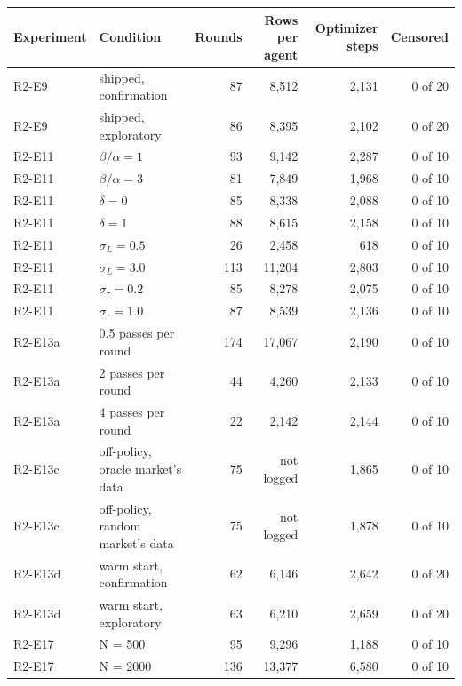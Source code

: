 \footnotesize
\begin{tabular}{llrrrr}
\hline
Experiment & Condition & Rounds & Rows per agent & Optimizer steps & Censored \\
\hline
R2-E9 & shipped, confirmation & 87 & 8{,}512 & 2{,}131 & 0 of 20 \\
R2-E9 & shipped, exploratory & 86 & 8{,}395 & 2{,}102 & 0 of 20 \\
R2-E11 & $\beta/\alpha = 1$ & 93 & 9{,}142 & 2{,}287 & 0 of 10 \\
R2-E11 & $\beta/\alpha = 3$ & 81 & 7{,}849 & 1{,}968 & 0 of 10 \\
R2-E11 & $\delta = 0$ & 85 & 8{,}338 & 2{,}088 & 0 of 10 \\
R2-E11 & $\delta = 1$ & 88 & 8{,}615 & 2{,}158 & 0 of 10 \\
R2-E11 & $\sigma_L = 0.5$ & 26 & 2{,}458 & 618 & 0 of 10 \\
R2-E11 & $\sigma_L = 3.0$ & 113 & 11{,}204 & 2{,}803 & 0 of 10 \\
R2-E11 & $\sigma_\tau = 0.2$ & 85 & 8{,}278 & 2{,}075 & 0 of 10 \\
R2-E11 & $\sigma_\tau = 1.0$ & 87 & 8{,}539 & 2{,}136 & 0 of 10 \\
R2-E13a & 0.5 passes per round & 174 & 17{,}067 & 2{,}190 & 0 of 10 \\
R2-E13a & 2 passes per round & 44 & 4{,}260 & 2{,}133 & 0 of 10 \\
R2-E13a & 4 passes per round & 22 & 2{,}142 & 2{,}144 & 0 of 10 \\
R2-E13c & off-policy, oracle market's data & 75 & not logged & 1{,}865 & 0 of 10 \\
R2-E13c & off-policy, random market's data & 75 & not logged & 1{,}878 & 0 of 10 \\
R2-E13d & warm start, confirmation & 62 & 6{,}146 & 2{,}642 & 0 of 20 \\
R2-E13d & warm start, exploratory & 63 & 6{,}210 & 2{,}659 & 0 of 20 \\
R2-E17 & N = 500 & 95 & 9{,}296 & 1{,}188 & 0 of 10 \\
R2-E17 & N = 2000 & 136 & 13{,}377 & 6{,}580 & 0 of 10 \\
\hline
\end{tabular}
